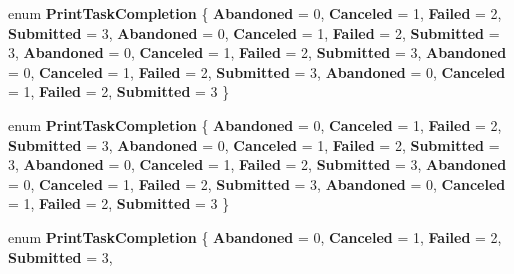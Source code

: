 \begin{DoxyCompactItemize}
\item 
\mbox{\label{namespace_windows_1_1_graphics_1_1_printing_ad838d31091822f0e6a5be87e27a87561}} 
enum {\bfseries Print\+Task\+Completion} \{ \newline
{\bfseries Abandoned} = 0, 
{\bfseries Canceled} = 1, 
{\bfseries Failed} = 2, 
{\bfseries Submitted} = 3, 
\newline
{\bfseries Abandoned} = 0, 
{\bfseries Canceled} = 1, 
{\bfseries Failed} = 2, 
{\bfseries Submitted} = 3, 
\newline
{\bfseries Abandoned} = 0, 
{\bfseries Canceled} = 1, 
{\bfseries Failed} = 2, 
{\bfseries Submitted} = 3, 
\newline
{\bfseries Abandoned} = 0, 
{\bfseries Canceled} = 1, 
{\bfseries Failed} = 2, 
{\bfseries Submitted} = 3, 
\newline
{\bfseries Abandoned} = 0, 
{\bfseries Canceled} = 1, 
{\bfseries Failed} = 2, 
{\bfseries Submitted} = 3
 \}
\item 
\mbox{\label{namespace_windows_1_1_graphics_1_1_printing_ad838d31091822f0e6a5be87e27a87561}} 
enum {\bfseries Print\+Task\+Completion} \{ \newline
{\bfseries Abandoned} = 0, 
{\bfseries Canceled} = 1, 
{\bfseries Failed} = 2, 
{\bfseries Submitted} = 3, 
\newline
{\bfseries Abandoned} = 0, 
{\bfseries Canceled} = 1, 
{\bfseries Failed} = 2, 
{\bfseries Submitted} = 3, 
\newline
{\bfseries Abandoned} = 0, 
{\bfseries Canceled} = 1, 
{\bfseries Failed} = 2, 
{\bfseries Submitted} = 3, 
\newline
{\bfseries Abandoned} = 0, 
{\bfseries Canceled} = 1, 
{\bfseries Failed} = 2, 
{\bfseries Submitted} = 3, 
\newline
{\bfseries Abandoned} = 0, 
{\bfseries Canceled} = 1, 
{\bfseries Failed} = 2, 
{\bfseries Submitted} = 3
 \}
\item 
\mbox{\label{namespace_windows_1_1_graphics_1_1_printing_ad838d31091822f0e6a5be87e27a87561}} 
enum {\bfseries Print\+Task\+Completion} \{ \newline
{\bfseries Abandoned} = 0, 
{\bfseries Canceled} = 1, 
{\bfseries Failed} = 2, 
{\bfseries Submitted} = 3, 

\end{DoxyCompactItemize}

